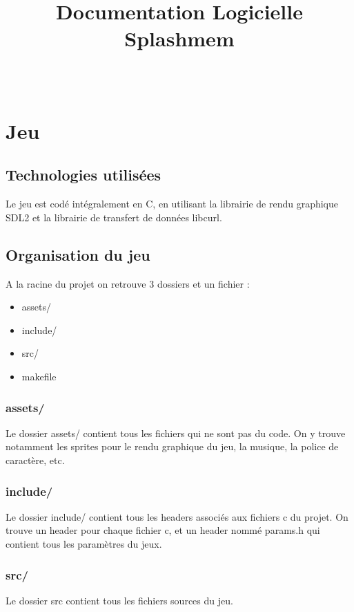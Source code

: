 \documentclass[12pt, openany]{article}
\title{Documentation Logicielle Splashmem}
\date{~}
\begin{document}
	\maketitle

	\tableofcontents
	
	\section{Jeu}
	\subsection{Technologies utilisées}
	Le jeu est codé intégralement en C, en utilisant la librairie de rendu graphique SDL2 et la librairie de transfert de données libcurl.\\
	\subsection{Organisation du jeu}
	A la racine du projet on retrouve 3 dossiers et un fichier :
	\begin{itemize}[label=$-$]
		\item assets/
		\item include/
		\item src/
		\item makefile
	\end{itemize}
	
	\subsubsection{assets/}
	Le dossier assets/ contient tous les fichiers qui ne sont pas du code. On y trouve notamment les sprites pour le rendu graphique du jeu, la musique, la police de caractère, etc.\\
	
	\subsubsection{include/}
	Le dossier include/ contient tous les headers associés aux fichiers c du projet. On trouve un header pour chaque fichier c, et un header nommé params.h qui contient tous les paramètres du jeux.\\
	
	\subsubsection{src/}
	Le dossier src contient tous les fichiers sources du jeu.\\
	
\end{document}
